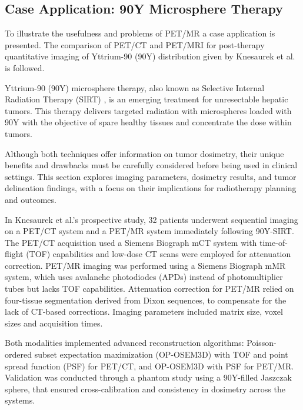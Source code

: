 \documentclass[11pt]{article} %
\begin{document}
\begin{multicols}{2}
	
	

\section{Case Application: 90Y Microsphere Therapy}

To illustrate the usefulness and problems of PET/MR a case application is presented. The comparison of PET/CT and PET/MRI for post-therapy quantitative imaging of Yttrium-90 (90Y) distribution given by Knesaurek et al. \cite{knesaurek2018} is followed.

Yttrium-90 (90Y) microsphere therapy, also known as Selective Internal Radiation Therapy (SIRT) %
, is an emerging treatment for unresectable hepatic tumors. This therapy delivers targeted radiation with microspheres loaded with 90Y with the objective of spare healthy tissues and concentrate the dose within tumors.

Although both techniques offer information on tumor dosimetry, their unique benefits and drawbacks must be carefully considered before being used in clinical settings. This section explores imaging parameters, dosimetry results, and tumor delineation findings, with a focus on their implications for radiotherapy planning and outcomes.

In Knesaurek et al.’s prospective study, 32 patients underwent sequential imaging on a PET/CT system and a PET/MR system immediately following 90Y-SIRT. The PET/CT acquisition used a Siemens Biograph mCT system with time-of-flight (TOF) capabilities and low-dose CT scans were employed for attenuation correction. PET/MR imaging was performed using a Siemens Biograph mMR system, which uses avalanche photodiodes (APDs) instead of photomultiplier tubes but lacks TOF capabilities. 
Attenuation correction for PET/MR relied on four-tissue segmentation derived from Dixon sequences, %
to compensate for the lack of CT-based corrections. Imaging parameters included matrix size, voxel sizes and acquisition times. 


Both modalities implemented advanced reconstruction algorithms: Poisson-ordered subset expectation maximization (OP-OSEM3D) with TOF and point spread function (PSF) for PET/CT, and OP-OSEM3D with PSF for PET/MR. Validation was conducted through a phantom study using a 90Y-filled Jaszczak sphere, that ensured cross-calibration and consistency in dosimetry across the systems.


\end{multicols}
\end{document}
